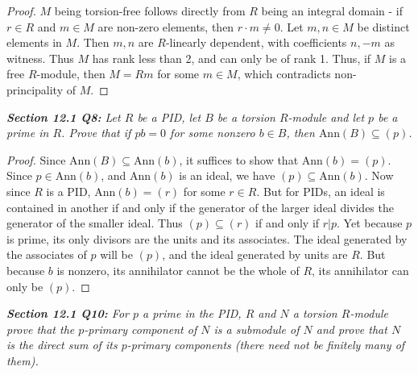 \documentclass{article}
\begin{document}
  \begin{proof}
    $M$ being torsion-free follows directly from $R$ being an integral
    domain - if $r\in R$ and $m\in M$ are non-zero elements, then $r\cdot
    m\neq 0$. Let $m,n\in M$ be distinct elements in $M$. Then $m,n$ are
    $R$-linearly dependent, with coefficients $n,-m$ as witness. Thus $M$
    has rank less than 2, and can only be of rank 1. Thus, if $M$ is a free
    $R$-module, then $M=Rm$ for some $m\in M$, which contradicts
    non-principality of $M$.
  \end{proof}

\it \textbf{Section 12.1 Q8:} Let $R$ be a PID, let $B$ be a torsion
  $R$-module and let $p$ be a prime in $R$. Prove that if $pb=0$ for some
  nonzero $b\in B$, then $\text{Ann}(B)\subseteq(p)$.

  \begin{proof}
    Since $\text{Ann}(B)\subseteq\text{Ann}(b)$, it suffices to show that
    $\text{Ann}(b)=(p)$. Since $p\in\text{Ann}(b)$, and $\text{Ann}(b)$ is
    an ideal, we have $(p)\subseteq\text{Ann}(b)$. Now since $R$ is a PID,
    $\text{Ann}(b)=(r)$ for some $r\in R$. But for PIDs, an ideal is
    contained in another if and only if the generator of the larger ideal
    divides the generator of the smaller ideal. Thus $(p)\subseteq(r)$ if
    and only if $r|p$. Yet because $p$ is prime, its only divisors are the
    units and its associates. The ideal generated by the associates of $p$
    will be $(p)$, and the ideal generated by units are $R$. But because
    $b$ is nonzero, its annihilator cannot be the whole of $R$, its
    annihilator can only be $(p)$.
  \end{proof}

\it \textbf{Section 12.1 Q10:} For $p$ a prime in the PID, $R$ and $N$ a
  torsion $R$-module prove that the $p$-primary component of $N$ is a
  submodule of $N$ and prove that $N$ is the direct sum of its $p$-primary
  components (there need not be finitely many of them).
\end{document}

